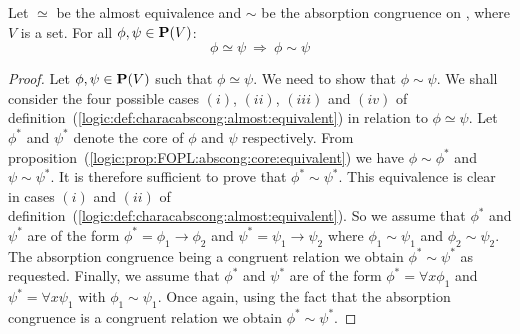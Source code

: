 \begin{prop}\label{logic:prop:characabscong:almost:implies:abs:congruence}
Let $\simeq$ be the almost equivalence and $\sim$ be the absorption
congruence on \pv, where $V$ is a set. For all $\phi,\psi\in\mbox{${\bf P}(V)$}$:
    \[
    \phi\simeq\psi\ \Rightarrow\ \phi\sim\psi
    \]
\end{prop}
\begin{proof}
Let $\phi,\psi\in\mbox{${\bf P}(V)$}$ such that $\phi\simeq\psi$. We need to show
that $\phi\sim\psi$. We shall consider the four possible cases
$(i)$, $(ii)$, $(iii)$ and $(iv)$ of
definition~(\ref{logic:def:characabscong:almost:equivalent}) in
relation to $\phi\simeq\psi$. Let $\phi^{*}$ and $\psi^{*}$ denote
the core of $\phi$ and $\psi$ respectively. From
proposition~(\ref{logic:prop:FOPL:abscong:core:equivalent}) we have
$\phi\sim\phi^{*}$ and $\psi\sim\psi^{*}$. It is therefore
sufficient to prove that $\phi^{*}\sim\psi^{*}$. This equivalence is
clear in cases $(i)$ and $(ii)$ of
definition~(\ref{logic:def:characabscong:almost:equivalent}). So we
assume that $\phi^{*}$ and $\psi^{*}$ are of the form
$\phi^{*}=\phi_{1}\to\phi_{2}$ and $\psi^{*}=\psi_{1}\to\psi_{2}$
where $\phi_{1}\sim\psi_{1}$ and $\phi_{2}\sim\psi_{2}$. The
absorption congruence being a congruent relation we obtain
$\phi^{*}\sim\psi^{*}$ as requested. Finally, we assume that
$\phi^{*}$ and $\psi^{*}$ are of the form $\phi^{*}=\forall
x\phi_{1}$ and $\psi^{*}=\forall x\psi_{1}$ with
$\phi_{1}\sim\psi_{1}$. Once again, using the fact that the
absorption congruence is a congruent relation we obtain
$\phi^{*}\sim\psi^{*}$.
\end{proof}


